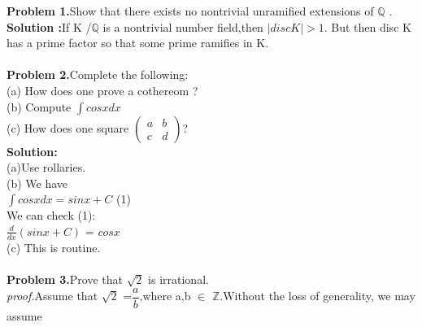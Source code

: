 \documentclass{knittingpattern}
\begin{document}
\newpage
\noindent{}
\hline
\vspace{3mm}
\begin{flushleft}
\textbf{Problem 1.}Show that there exists no nontrivial unramified extensions of  $\mathbb{Q}$ .\\
\vspace{3mm}
\textbf{Solution :}If K /$\mathbb{Q}$ is a nontrivial number field,then $\mid disc K \mid > 1$. But then disc K has a prime factor so that some prime ramifies in K.\\
\hspace{19cm}
\framebox[3mm][r]{}\\
\textbf{Problem 2.}Complete the following:\\
\vspace{2mm}
(a) How does one prove a cothereom ? \\
\vspace{0.4cm}
(b) Compute \(\int cosx dx\)\\  
\vspace{0.4cm}
(c) How does one square
$\begin{pmatrix}
a & b \\
c & d 
\end{pmatrix}$?\\
\vspace{0.5cm}
\textbf{Solution:}\\
\vspace{0.5cm}
(a)Use rollaries.\\
\vspace{0.5cm}
(b) We have \\
\hspace{5cm}
\(\int cosx dx = sinx+C\)
 \hspace{9.3cm} (1)\\
 We can check (1):\\
 \hspace{5cm}
 $\frac{d}{dx}{(sinx+C)}$ = $cosx$\\
 \vspace{0.5cm}
 (c) This is routine.\\
 \hspace{19.5cm}\framebox[3mm][r]{}\\
 \vspace{0.1cm}
 \textbf{Problem 3.}Prove that $\sqrt{2}$ is irrational.\\
 \vspace{0.2cm}
 \textit{proof.}Assume that $\sqrt{2}$ =\large{$\dfrac{a}{b}$},where a,b $\in$ $\mathbb{Z}$.Without the loss of generality, we may assume 

\end{flushleft}
\end{document}
